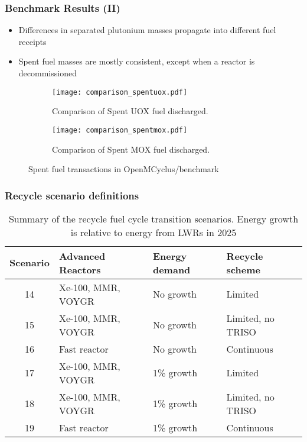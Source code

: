 \begin{frame}
    \frametitle{Benchmark Results (II)}
        \begin{itemize}
            \item Differences in separated plutonium masses 
                  propagate into different fuel receipts 
            \item Spent fuel masses are mostly consistent, except 
                  when a reactor is decommissioned
        \end{itemize}
        \begin{figure}
            \centering
            \begin{subfigure}{0.48\textwidth}
                \texttt{[image: comparison\_spentuox.pdf]}
                \caption{Comparison of Spent UOX fuel discharged.}
            \end{subfigure}
            \hfill
            \begin{subfigure}{0.48\textwidth}
                \texttt{[image: comparison\_spentmox.pdf]}
                \caption{Comparison of Spent MOX fuel discharged.}
            \end{subfigure}
            \caption{Spent fuel transactions in OpenMCyclus/\Cycamore benchmark}
            \label{fig:spentfuel_benchmark}
        \end{figure}

\end{frame}

\begin{frame}
    \frametitle{Recycle scenario definitions}
    \begin{table}[ht]
        \centering
        \caption{Summary of the recycle fuel cycle transition scenarios.
        Energy growth is relative to energy from \glspl{LWR} in 2025}
        \label{tab:scenarios_recycle}
        \begin{tabular}{c l l l}
            \hline
            Scenario & Advanced Reactors & Energy demand & Recycle scheme\\\hline
            \rowcolor{lightgray}14 & Xe-100, MMR, VOYGR & No growth & Limited \\
            \rowcolor{lightgray}15 & Xe-100, MMR, VOYGR & No growth & Limited, no TRISO\\
            \rowcolor{lightgray}16 & Fast reactor & No growth & Continuous \\
            \rowcolor{lightpink}17 & Xe-100, MMR, VOYGR & 1\% growth & Limited \\
            \rowcolor{lightpink}18 & Xe-100, MMR, VOYGR & 1\% growth & Limited, no TRISO\\
            \rowcolor{lightpink}19 & Fast reactor & 1\% growth & Continuous\\
            \hline
    \end{tabular}
    \end{table}
\end{frame}

